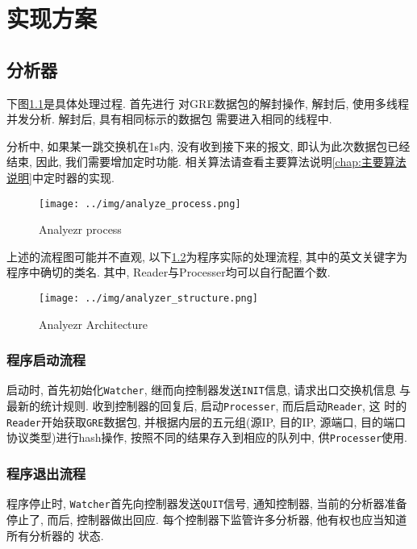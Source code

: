 \chapter{实现方案}
\label{chap:实现方案}

\section{分析器}

下图\ref{fig:analyzer_process}是具体处理过程. 首先进行
对GRE数据包的解封操作, 解封后, 使用多线程并发分析. 解封后,
具有相同标示的数据包 需要进入相同的线程中.

分析中, 如果某一跳交换机在1s内, 没有收到接下来的报文,
即认为此次数据包已经结束, 因此, 我们需要增加定时功能.
相关算法请查看主要算法说明\ref{chap:主要算法说明}中定时器的实现.

\begin{figure}
  \centering
  \texttt{[image: ../img/analyze\_process.png]}
  \caption{Analyezr process}
  \label{fig:analyzer_process}
\end{figure}

上述的流程图可能并不直观, 以下\ref{fig:analyzer_arch}为程序实际的处理流程,
其中的英文关键字为程序中确切的类名. 其中,
Reader与Processer均可以自行配置个数.

\begin{figure}
  \centering
  \texttt{[image: ../img/analyzer\_structure.png]}
  \caption{Analyezr Architecture}
  \label{fig:analyzer_arch}
\end{figure}

\subsection{程序启动流程}

启动时, 首先初始化\texttt{Watcher}, 继而向控制器发送\texttt{INIT}信息,
请求出口交换机信息 与最新的统计规则. 收到控制器的回复后,
启动\texttt{Processer}, 而后启动\texttt{Reader}, 这
时的\texttt{Reader}开始获取\texttt{GRE}数据包, 并根据内层的五元组(源IP,
目的IP, 源端口, 目的端口 协议类型)进行hash操作,
按照不同的结果存入到相应的队列中, 供\texttt{Processer}使用.

\subsection{程序退出流程}

程序停止时, \texttt{Watcher}首先向控制器发送\texttt{QUIT}信号,
通知控制器, 当前的分析器准备 停止了, 而后, 控制器做出回应.
每个控制器下监管许多分析器, 他有权也应当知道所有分析器的 状态.

